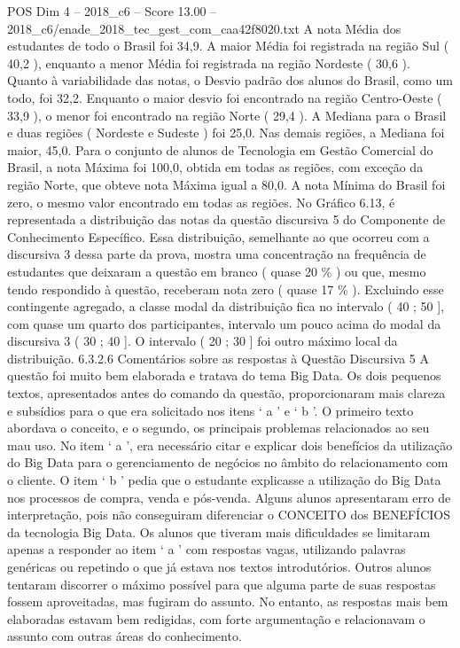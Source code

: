 \begin{textsample}{POS Dim 4 – 2018\_c6 – Score 13.00 – 2018\_c6/enade\_2018\_tec\_gest\_com\_caa42f8020.txt}
A nota Média dos estudantes de todo o Brasil foi 34,9.
A maior Média foi registrada na região Sul ( 40,2 ), enquanto a menor Média foi registrada na região Nordeste ( 30,6 ).
Quanto à variabilidade das notas, o Desvio padrão dos alunos do Brasil, como um todo, foi 32,2.
Enquanto o maior desvio foi encontrado na região Centro-Oeste ( 33,9 ), o menor foi encontrado na região Norte ( 29,4 ).
A Mediana para o Brasil e duas regiões ( Nordeste e Sudeste ) foi 25,0.
Nas demais regiões, a Mediana foi maior, 45,0.
Para o conjunto de alunos de Tecnologia em Gestão Comercial do Brasil, a nota Máxima foi 100,0, obtida em todas as regiões, com exceção da região Norte, que obteve nota Máxima igual a 80,0.
A nota Mínima do Brasil foi zero, o mesmo valor encontrado em todas as regiões.
No Gráfico 6.13, é representada a distribuição das notas da questão discursiva 5 do Componente de Conhecimento Específico.
Essa distribuição, semelhante ao que ocorreu com a discursiva 3 dessa parte da prova, mostra uma concentração na frequência de estudantes que deixaram a questão em branco ( quase 20 \% ) ou que, mesmo tendo respondido à questão, receberam nota zero ( quase 17 \% ).
Excluindo esse contingente agregado, a classe modal da distribuição fica no intervalo ( 40 ; 50 ], com quase um quarto dos participantes, intervalo um pouco acima do modal da discursiva 3 ( 30 ; 40 ].
O intervalo ( 20 ; 30 ] foi outro máximo local da distribuição. 6.3.2.6 Comentários sobre as respostas à Questão Discursiva 5 A questão foi muito bem elaborada e tratava do tema Big Data.
Os dois pequenos textos, apresentados antes do comando da questão, proporcionaram mais clareza e subsídios para o que era solicitado nos itens ‘ a ’ e ‘ b ’.
O primeiro texto abordava o conceito, e o segundo, os principais problemas relacionados ao seu mau uso.
No item ‘ a ’, era necessário citar e explicar dois benefícios da utilização do Big Data para o gerenciamento de negócios no âmbito do relacionamento com o cliente.
O item ‘ b ’ pedia que o estudante explicasse a utilização do Big Data nos processos de compra, venda e pós-venda.
Alguns alunos apresentaram erro de interpretação, pois não conseguiram diferenciar o CONCEITO dos BENEFÍCIOS da tecnologia Big Data.
Os alunos que tiveram mais dificuldades se limitaram apenas a responder ao item ‘ a ’ com respostas vagas, utilizando palavras genéricas ou repetindo o que já estava nos textos introdutórios.
Outros alunos tentaram discorrer o máximo possível para que alguma parte de suas respostas fossem aproveitadas, mas fugiram do assunto.
No entanto, as respostas mais bem elaboradas estavam bem redigidas, com forte argumentação e relacionavam o assunto com outras áreas do conhecimento.

\end{textsample}

